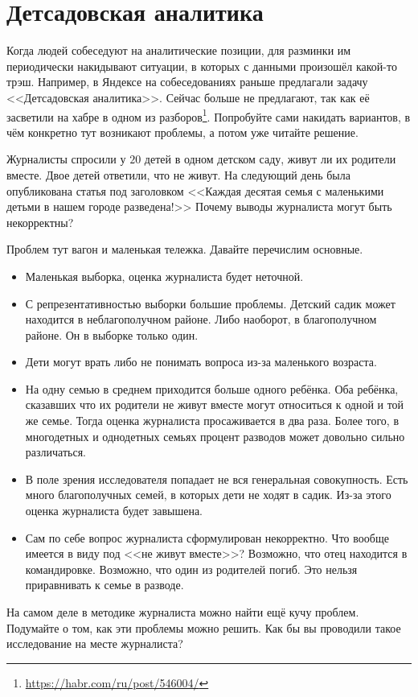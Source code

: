 \documentclass[12pt, a4paper, oneside]{article}
\begin{document}
\section{Детсадовская аналитика} 

Когда людей собеседуют на аналитические позиции, для разминки им периодически накидывают ситуации, в которых с данными произошёл какой-то трэш. Например, в Яндексе на собеседованиях раньше предлагали задачу <<Детсадовская аналитика>>. Сейчас больше не предлагают, так как её засветили на хабре в одном из разборов\footnote{\url{https://habr.com/ru/post/546004/}}. Попробуйте сами накидать вариантов, в чём конкретно тут возникают проблемы, а потом уже читайте решение.

\begin{problem}{}
Журналисты спросили у $20$ детей в одном детском саду, живут ли их родители вместе. Двое детей ответили, что не живут. На следующий день была опубликована статья под заголовком <<Каждая десятая семья с маленькими детьми в нашем городе разведена!>> Почему выводы журналиста могут быть некорректны?
\end{problem}

\begin{sol} 
Проблем тут вагон и маленькая тележка. Давайте перечислим основные.

\begin{itemize} 
    \item Маленькая выборка, оценка журналиста будет неточной. 
    \item С репрезентативностью выборки большие проблемы. Детский садик может находится в неблагополучном районе. Либо наоборот, в благополучном районе. Он в выборке только один. 
    \item Дети могут врать либо не понимать вопроса из-за маленького возраста.
    \item На одну семью в среднем приходится больше одного ребёнка. Оба ребёнка, сказавших что их родители не живут вместе могут относиться к одной и той же семье. Тогда оценка журналиста просаживается в два раза. Более того, в многодетных и однодетных семьях процент разводов может довольно сильно различаться. 
    \item В поле зрения исследователя попадает не вся генеральная совокупность. Есть много благополучных семей, в которых дети не ходят в садик. Из-за этого оценка журналиста будет завышена. 
    \item Сам по себе вопрос журналиста сформулирован некорректно. Что вообще имеется в виду под <<не живут вместе>>? Возможно, что отец находится в командировке. Возможно, что один из родителей погиб. Это нельзя приравнивать к семье в разводе. 
\end{itemize}

На самом деле в методике журналиста можно найти ещё кучу проблем. Подумайте о том, как эти проблемы можно решить. Как бы вы проводили такое исследование на месте журналиста? 
\end{sol} 
\end{document}
